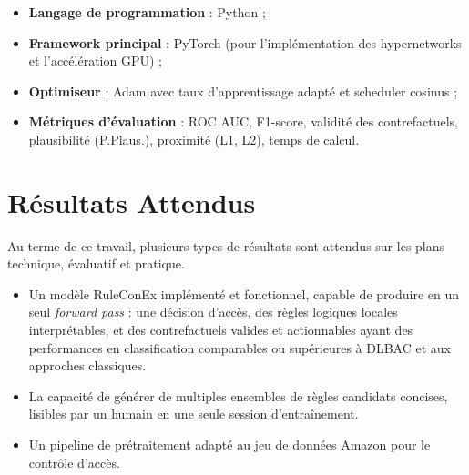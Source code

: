 \documentclass[12pt,a4paper]{article}
\begin{document}
\begin{itemize}
  \item \textbf{Langage de programmation} : Python ;
  \item \textbf{Framework principal} : PyTorch (pour l'impl\'ementation des hypernetworks et l'acc\'el\'eration GPU) ;
  \item \textbf{Optimiseur} : Adam avec taux d'apprentissage adapt\'e et scheduler cosinus ;
  \item \textbf{M\'etriques d'\'evaluation} : ROC AUC, F1-score, validit\'e des contrefactuels, plausibilit\'e (P.Plaus.), proximit\'e (L1, L2), temps de calcul.
\end{itemize}


\section{R\'esultats Attendus}

Au terme de ce travail, plusieurs types de r\'esultats sont attendus sur les plans technique, \'evaluatif et pratique.


\begin{itemize}
  \item Un mod\`ele RuleConEx impl\'ement\'e et fonctionnel, capable de produire en un seul \textit{forward pass} : une d\'ecision d'acc\`es, des r\`egles logiques locales interpr\'etables, et des contrefactuels valides et actionnables ayant des performances en classification comparables ou sup\'erieures \`a DLBAC et aux approches classiques.
  \item La capacit\'e de g\'en\'erer de multiples ensembles de r\`egles candidats concises, lisibles par un humain en une seule session d'entra\^inement.
  \item Un pipeline de pr\'etraitement adapt\'e au jeu de donn\'ees Amazon pour le contr\^ole d'acc\`es.
\end{itemize}

\end{document}
